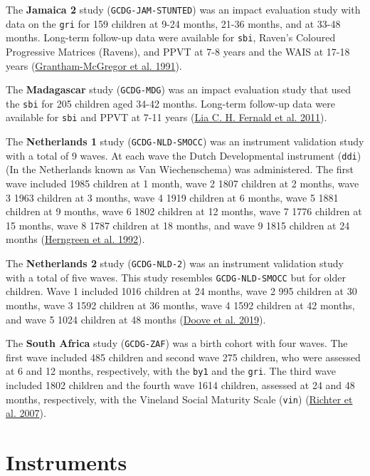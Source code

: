 \documentclass[
]{book}
\begin{document}
The \textbf{Jamaica 2} study (\texttt{GCDG-JAM-STUNTED}) was an impact evaluation study with data on the \texttt{gri} for 159 children at 9-24 months, 21-36 months, and at 33-48 months. Long-term follow-up data were available for \texttt{sbi}, Raven's Coloured Progressive Matrices (Ravens), and PPVT at 7-8 years and the WAIS at 17-18 years (\protect\hyperlink{ref-Grantham-McGregor1991}{Grantham-McGregor et al. 1991}).

The \textbf{Madagascar} study (\texttt{GCDG-MDG}) was an impact evaluation study that used the \texttt{sbi} for 205 children aged 34-42 months. Long-term follow-up data were available for \texttt{sbi} and PPVT at 7-11 years (\protect\hyperlink{ref-Fernald2011}{Lia C. H. Fernald et al. 2011}).

The \textbf{Netherlands 1} study (\texttt{GCDG-NLD-SMOCC}) was an instrument validation study with a total of 9 waves. At each wave the Dutch Developmental instrument (\texttt{ddi}) (In the Netherlands known as Van Wiechenschema) was administered. The first wave included 1985 children at 1 month, wave 2 1807 children at 2 months, wave 3 1963 children at 3 months, wave 4 1919 children at 6 months, wave 5 1881 children at 9 months, wave 6 1802 children at 12 months, wave 7 1776 children at 15 months, wave 8 1787 children at 18 months, and wave 9 1815 children at 24 months (\protect\hyperlink{ref-herngreen1992}{Herngreen et al. 1992}).

The \textbf{Netherlands 2} study (\texttt{GCDG-NLD-2}) was an instrument validation study with a total of five waves. This study resembles \texttt{GCDG-NLD-SMOCC} but for older children. Wave 1 included 1016 children at 24 months, wave 2 995 children at 30 months, wave 3 1592 children at 36 months, wave 4 1592 children at 42 months, and wave 5 1024 children at 48 months (\protect\hyperlink{ref-doove2019}{Doove et al. 2019}).

The \textbf{South Africa} study (\texttt{GCDG-ZAF}) was a birth cohort with four waves. The first wave included 485 children and second wave 275 children, who were assessed at 6 and 12 months, respectively, with the \texttt{by1} and the \texttt{gri}. The third wave included 1802 children and the fourth wave 1614 children, assessed at 24 and 48 months, respectively, with the Vineland Social Maturity Scale (\texttt{vin}) (\protect\hyperlink{ref-Richter2007}{Richter et al. 2007}).

\hypertarget{sec:instruments}{%
\section{Instruments}\label{sec:instruments}}
\end{document}
